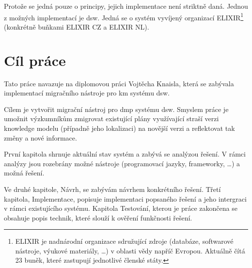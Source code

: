 Protože se jedná pouze o principy, jejich implementace není striktně daná.
Jednou z možných implementací je \gls{dsw}.
Jedná se o systém vyvíjený organizací ELIXIR\footnote{ELIXIR je nadnárodní organizace sdružující zdroje (databáze, softwarové nástroje, výukové materiály, \dots) v oblasti vědy napříč Evropou. Aktuálně čítá 23 buněk, které zastupují jednotlivé členské státy.} (konkrétně buňkami ELIXIR CZ a ELIXIR NL).

\section*{Cíl práce}

Tato práce navazuje na diplomovou práci Vojtěcha Knaisla, která se zabývala implementací migračního nástroje pro \gls{km} systému \gls{dsw}.

Cílem je vytvořit migrační nástroj pro \gls{dmp} systému \gls{dsw}.
Smyslem práce je umožnit výzkumníkům zmigrovat existující plány využívající straší verzi knowledge modelu (případně jeho lokalizaci) na novější verzi a reflektovat tak změny a nové informace.

\medskip

První kapitola shrnuje aktuální stav systém a zabývá se analýzou řešení.
V rámci analýzy jsou rozebrány možné nástroje (programovací jazyky, frameworky, \dots) a možná řešení.

Ve druhé kapitole, Návrh, se zabývám návrhem konkrétního řešení.
Třetí kapitola, Implementace, popisuje implementaci popsaného řešení a jeho intergraci v rámci existujícího systému.
Kapitola Testování, kterou je práce zakončena se obsahuje popis technik, které slouží k ověření funkčnosti řešení.
